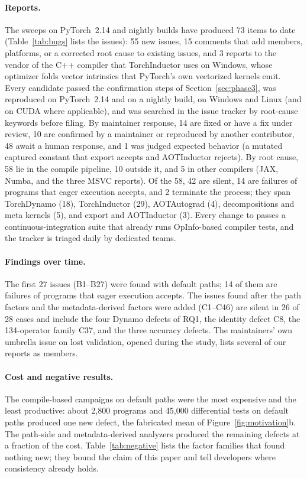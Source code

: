 \paragraph{Reports.} The sweeps on PyTorch~2.14 and nightly builds have produced 73 items to date
(Table~\ref{tab:bugs} lists the issues): 55 new issues, 15 comments that add members, platforms, or a
corrected root cause to existing issues, and 3 reports to the vendor of the C++ compiler that TorchInductor
uses on Windows, whose optimizer folds vector intrinsics that PyTorch's own vectorized kernels emit. Every
candidate passed the confirmation steps of Section~\ref{sec:phase3}, was reproduced on PyTorch~2.14 and on a
nightly build, on Windows and Linux (and on CUDA where applicable), and was searched in the issue tracker by
root-cause keywords before filing. By maintainer response, 14 are fixed or have a fix under review, 10 are
confirmed by a maintainer or reproduced by another contributor, 48 await a human response, and 1 was judged
expected behavior (a mutated captured constant that export accepts and AOTInductor rejects). By root cause, 58
lie in the compile pipeline, 10 outside it, and 5 in other compilers (JAX, Numba, and the three MSVC reports). Of the 58,
42 are silent, 14 are failures of programs that eager execution accepts, and 2 terminate the process; they
span TorchDynamo (18), TorchInductor (29), AOTAutograd (4), decompositions and meta kernels (5), and export and
AOTInductor (3). Every change to \tcompile passes a continuous-integration suite that already runs OpInfo-based compiler
tests, and the tracker is triaged daily by dedicated teams.



\paragraph{Findings over time.} The first 27 issues (B1--B27) were found with default paths; 14 of them are
failures of programs that eager execution accepts. The issues found after the path factors and the
metadata-derived factors were added (C1--C46) are silent in 26 of 28 cases and include the four Dynamo defects
of RQ1, the identity defect C8, the 134-operator family C37, and the three accuracy defects. The maintainers'
own umbrella issue on lost validation, opened during the study, lists several of our reports as members.



\paragraph{Cost and negative results.} The compile-based campaigns on default paths were the most expensive and the least productive:
about 2{,}800 programs and 45{,}000 differential tests on default paths produced one new defect, the
fabricated mean of Figure~\ref{fig:motivation}b. The path-side and metadata-derived analyzers produced the
remaining defects at a fraction of the cost. Table~\ref{tab:negative} lists the factor families that found
nothing new; they bound the claim of this paper and tell developers where consistency already holds.


